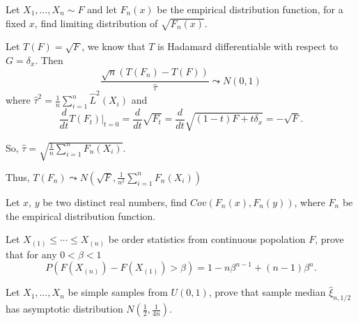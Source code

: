 \begin{problem}
    Let $X_1,\ldots,X_n\sim F$ and let $ F_n(x)$ be the empirical distribution function, for a fixed $x$,  find limiting distribution of $\sqrt{F_n(x)}$.
\end{problem}

\begin{solution}


Let $T(F)=\sqrt{F}$, we know that $T$ is Hadamard differentiable with respect to $G=\delta_x$. 
Then
\begin{equation*}
    \frac{\sqrt{n} (T (F_n) - T(F))}{\hat{\tau}} \leadsto N(0, 1)
\end{equation*}
where $\hat{\tau}^2=\frac{1}{n}\sum_{i=1}^n \hat{L}^2(X_i)$ and
\begin{equation*}
    \frac{d}{dt}T(F_t) \Big|_{t=0} 
    = \frac{d}{dt} \sqrt{F_t} 
    = \frac{d}{dt} \sqrt{(1-t)F+t\delta_x}
    =  - \sqrt{F}.
\end{equation*}

So, $\hat{\tau} = \sqrt{\frac{1}{n}\sum_{i=1}^n F_n(X_i)} $.

Thus, $ T (F_n)  \leadsto N(\sqrt{F}, \frac{1}{n^2}\sum_{i=1}^n F_n(X_i))$

\end{solution}





\begin{problem}
    Let $x$, $y$ be two distinct real numbers, find $Cov(F_n(x),F_n(y))$, where $ F_n $ be the empirical distribution function. 
\end{problem}





\begin{problem}
    Let $ X_{(1)}\le\cdots\le X_{(n)}$ be order statistics from continuous popolation  $F$, prove that for any $0<\beta<1$
    \begin{equation*}
        P(F(X_{(n)})-F(X_{(1)})>\beta)=1-n\beta^{n-1}+(n-1)\beta^n.
    \end{equation*}
\end{problem}





\begin{problem}
    Let $ X_1,\ldots,X_n $ be simple samples from $U(0,1)$, prove that sample median $\hat\xi_{n,1/2}$ has asymptotic distribution $N(\frac12,\frac{1}{4n})$.
\end{problem}

